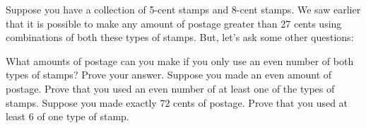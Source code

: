 \documentclass[11pt]{exam}
\begin{document}
Suppose you have a collection of 5-cent stamps and 8-cent stamps.  We saw earlier that it is possible to make any amount of postage greater than 27 cents using combinations of both these types of stamps.  But, let's ask some other questions:
\begin{questions}
\question What amounts of postage can you make if you only use an even number of both types of stamps? Prove your answer.
\vfill
\question Suppose you made an even amount of postage.  Prove that you used an even number of at least one of the types of stamps.
\vfill
\question Suppose you made exactly 72 cents of postage.  Prove that you used at least 6 of one type of stamp.
\vfill
\end{questions}

\end{document}
